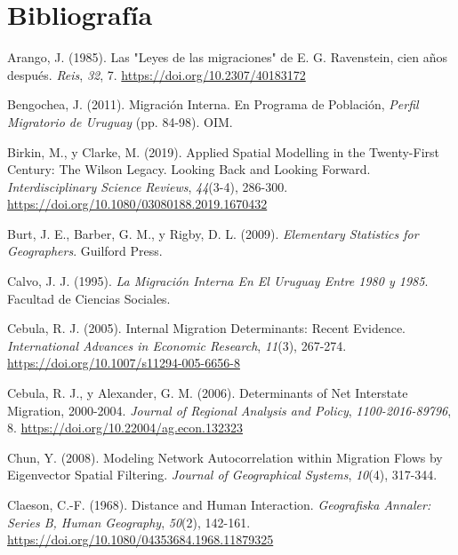 \documentclass[12pt,spanish,]{article}
\begin{document}
\newpage

\hypertarget{bibliografuxeda}{%
\section{Bibliografía}\label{bibliografuxeda}}

\hypertarget{refs}{}
\leavevmode\hypertarget{ref-arango1985}{}%
Arango, J. (1985). Las "Leyes de las migraciones" de E. G. Ravenstein,
cien años después. \emph{Reis}, \emph{32}, 7.
\url{https://doi.org/10.2307/40183172}

\leavevmode\hypertarget{ref-bengochea2011}{}%
Bengochea, J. (2011). Migración Interna. En Programa de Población,
\emph{Perfil Migratorio de Uruguay} (pp. 84-98). OIM.

\leavevmode\hypertarget{ref-birkin2019}{}%
Birkin, M., y Clarke, M. (2019). Applied Spatial Modelling in the
Twenty-First Century: The Wilson Legacy. Looking Back and Looking
Forward. \emph{Interdisciplinary Science Reviews}, \emph{44}(3-4),
286-300. \url{https://doi.org/10.1080/03080188.2019.1670432}

\leavevmode\hypertarget{ref-burt2009}{}%
Burt, J. E., Barber, G. M., y Rigby, D. L. (2009). \emph{Elementary
Statistics for Geographers}. Guilford Press.

\leavevmode\hypertarget{ref-calvo1995}{}%
Calvo, J. J. (1995). \emph{La Migración Interna En El Uruguay Entre 1980
y 1985}. Facultad de Ciencias Sociales.

\leavevmode\hypertarget{ref-cebula2005}{}%
Cebula, R. J. (2005). Internal Migration Determinants: Recent Evidence.
\emph{International Advances in Economic Research}, \emph{11}(3),
267-274. \url{https://doi.org/10.1007/s11294-005-6656-8}

\leavevmode\hypertarget{ref-cebula2006}{}%
Cebula, R. J., y Alexander, G. M. (2006). Determinants of Net Interstate
Migration, 2000-2004. \emph{Journal of Regional Analysis and Policy},
\emph{1100-2016-89796}, 8. \url{https://doi.org/10.22004/ag.econ.132323}

\leavevmode\hypertarget{ref-chun2008}{}%
Chun, Y. (2008). Modeling Network Autocorrelation within Migration Flows
by Eigenvector Spatial Filtering. \emph{Journal of Geographical
Systems}, \emph{10}(4), 317-344.

\leavevmode\hypertarget{ref-claeson1968}{}%
Claeson, C.-F. (1968). Distance and Human Interaction. \emph{Geografiska
Annaler: Series B, Human Geography}, \emph{50}(2), 142-161.
\url{https://doi.org/10.1080/04353684.1968.11879325}
\end{document}
